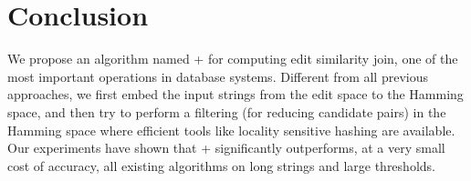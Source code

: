 \section{Conclusion}
\label{sec:conclude}

We propose an algorithm named \ebdjoin+ for computing edit similarity join, one of the most important operations in database systems.  Different from all previous approaches, we first embed the input strings from the edit space to the Hamming space, and then try to perform a filtering (for reducing candidate pairs) in the Hamming space where efficient tools like locality sensitive hashing are available.  Our experiments have shown that \ebdjoin+ significantly outperforms, at a very small cost of accuracy, all existing algorithms on long strings and large thresholds.
